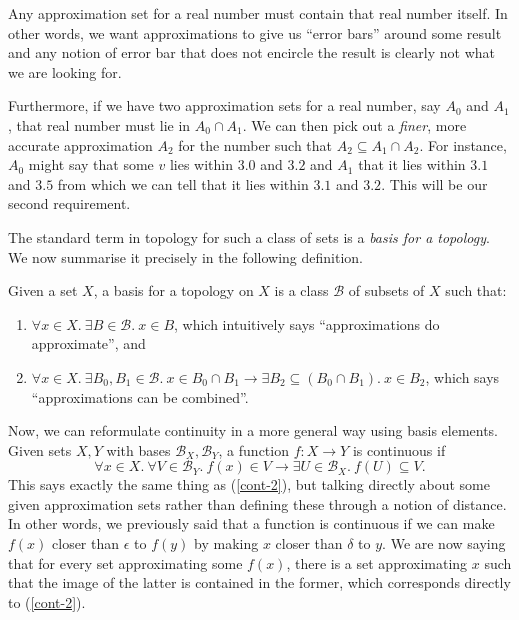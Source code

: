 Any approximation set for a real number must contain that real number itself. In other
words, we want approximations to give us ``error bars'' around some result and any notion
of error bar that does not encircle the result is clearly not what we are looking for.

Furthermore, if we have two approximation sets for a real number, say $A_0$ and $A_1$,
that real number must lie in $A_0 \cap A_1$. We can then pick out a \emph{finer}, more
accurate approximation $A_2$ for the number such that $A_2 \subseteq A_1 \cap A_2$. For instance,
$A_0$ might say that some $v$ lies within $3.0$ and $3.2$ and $A_1$ that it lies within
$3.1$ and $3.5$ from which we can tell that it lies within $3.1$ and $3.2$. This will be
our second requirement.

The standard term in topology for such a class of sets is a \emph{basis for a topology}.
We now summarise it precisely in the following definition.
\begin{defn}
  Given a set $X$, a basis for a topology on $X$ is a class $\mathcal{B}$ of subsets of
  $X$ such that:
  \begin{enumerate}
    \item $\forall x \in X.~ \exists B \in \mathcal{B}.~x \in B$, which intuitively says ``approximations do
      approximate'', and
    \item $\forall x \in X.~ \exists B_0, B_1 \in \mathcal{B}.~ x \in B_0 \cap B_1 \rightarrow \exists B_2 \subseteq (B_0 \cap B_1).~
      x \in B_2$, which says ``approximations can be combined''.
  \end{enumerate}
\end{defn}

Now, we can reformulate continuity in a more general way using basis elements. Given sets
$X, Y$ with bases $\mathcal{B}_X, \mathcal{B}_Y$, a function $f : X \rightarrow Y$ is continuous if
\begin{equation}\label{cont-basis}
  \forall x \in X.~ \forall V \in \mathcal{B}_Y.~ f(x) \in V \rightarrow \exists U \in \mathcal{B}_X.~
    f(U) \subseteq V.
\end{equation}
This says exactly the same thing as (\ref{cont-2}), but talking directly about some given
approximation sets rather than defining these through a notion of distance. In other
words, we previously said that a function is continuous if we can make $f(x)$ closer than
$\epsilon$ to $f(y)$ by making $x$ closer than $\delta$ to $y$. We are now saying that for every
set approximating some $f(x)$, there is a set approximating $x$ such that the image of
the latter is contained in the former, which corresponds directly to (\ref{cont-2}).

